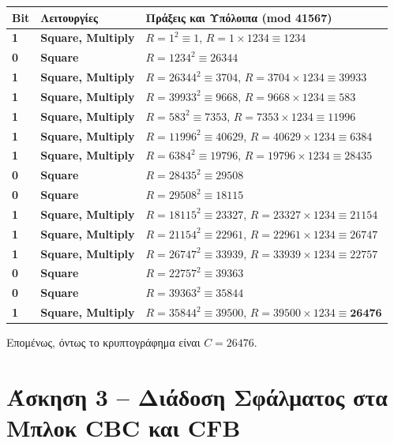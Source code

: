 \documentclass[12pt, a4paper]{article}
\begin{document}
\begin{table}[H]
\centering
\renewcommand{\arraystretch}{1.2}
\begin{tabular}{l l l}
\textbf{Bit} & \textbf{Λειτουργίες} & \textbf{Πράξεις και Υπόλοιπα (mod 41567)} \\
\midrule
\textbf{1} & \textbf{Square, Multiply} & $R = 1^2 \equiv 1$, $R = 1 \times 1234 \equiv 1234$ \\
\textbf{0} & \textbf{Square} & $R = 1234^2 \equiv 26344$ \\
\textbf{1} & \textbf{Square, Multiply} & $R = 26344^2 \equiv 3704$, $R = 3704 \times 1234 \equiv 39933$ \\
\textbf{1} & \textbf{Square, Multiply} & $R = 39933^2 \equiv 9668$, $R = 9668 \times 1234 \equiv 583$ \\
\textbf{1} & \textbf{Square, Multiply} & $R = 583^2 \equiv 7353$, $R = 7353 \times 1234 \equiv 11996$ \\
\textbf{1} & \textbf{Square, Multiply} & $R = 11996^2 \equiv 40629$, $R = 40629 \times 1234 \equiv 6384$ \\
\textbf{1} & \textbf{Square, Multiply} & $R = 6384^2 \equiv 19796$, $R = 19796 \times 1234 \equiv 28435$ \\
\textbf{0} & \textbf{Square} & $R = 28435^2 \equiv 29508$ \\
\textbf{0} & \textbf{Square} & $R = 29508^2 \equiv 18115$ \\
\textbf{1} & \textbf{Square, Multiply} & $R = 18115^2 \equiv 23327$, $R = 23327 \times 1234 \equiv 21154$ \\
\textbf{1} & \textbf{Square, Multiply} & $R = 21154^2 \equiv 22961$, $R = 22961 \times 1234 \equiv 26747$ \\
\textbf{1} & \textbf{Square, Multiply} & $R = 26747^2 \equiv 33939$, $R = 33939 \times 1234 \equiv 22757$ \\
\textbf{0} & \textbf{Square} & $R = 22757^2 \equiv 39363$ \\
\textbf{0} & \textbf{Square} & $R = 39363^2 \equiv 35844$ \\
\textbf{1} & \textbf{Square, Multiply} & $R = 35844^2 \equiv 39500$, $R = 39500 \times 1234 \equiv \mathbf{26476}$ \\
\end{tabular}
\end{table}

Επομένως, όντως το κρυπτογράφημα είναι \textbf{$C = 26476$}.

\section*{Άσκηση 3 – Διάδοση Σφάλματος στα Μπλοκ CBC και CFB}
\end{document}

